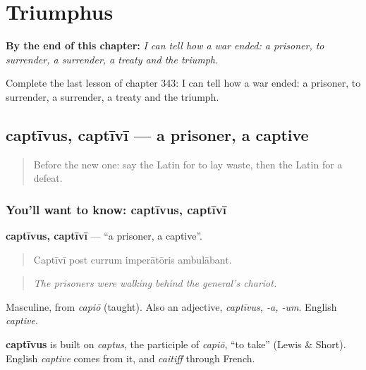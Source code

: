 
\chapter{Triumphus}
\label{ch:la-triumphus}

\begin{chapteropening}
\textbf{By the end of this chapter:} \emph{I can tell how a war ended: a prisoner, to surrender, a surrender, a treaty and the triumph.}

Complete the last lesson of chapter 343: I can tell how a war ended: a prisoner, to surrender, a surrender, a treaty and the triumph.
\end{chapteropening}

\section[captīvus, captīvī]{captīvus, captīvī — a prisoner, a captive}

\label{lesson:LA-C343-captivus}



\begin{quote}
Before the new one: say the Latin for to lay waste, then the Latin for a defeat.
\end{quote}

\subsection*{You'll want to know: captīvus, captīvī}
\textbf{captīvus, captīvī} — \textquotedblleft{}a prisoner, a captive\textquotedblright{}.

\begin{quote}
Captīvī post currum imperātōris ambulābant.
\end{quote}

\begin{quote}
\emph{The prisoners were walking behind the general's chariot.}
\end{quote}

Masculine, from \emph{capiō} (taught). Also an adjective, \emph{captīvus, -a, -um}. English \emph{captive}.

\begin{cousinweb}
\textbf{captīvus} is built on \emph{captus}, the participle of \emph{capiō}, \textquotedblleft{}to take\textquotedblright{} (Lewis \& Short). English \emph{captive} comes from it, and \emph{caitiff} through French.
\end{cousinweb}

